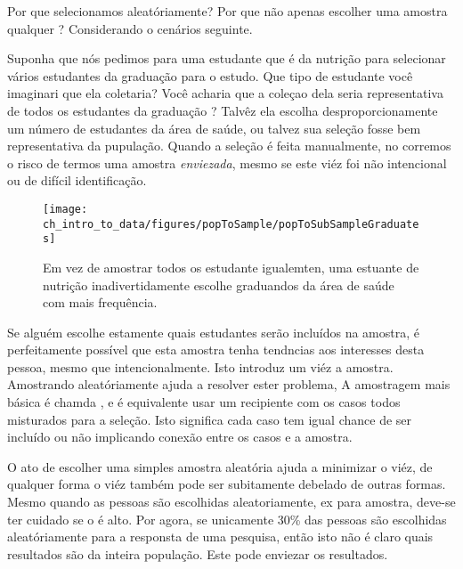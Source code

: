 Por que selecionamos aleatóriamente? Por que não apenas escolher uma amostra qualquer ? Considerando o cenários seguinte.

\begin{example}{Suponha que nós pedimos para uma estudante  que é da nutrição para selecionar vários estudantes da graduação para o estudo. Que tipo de estudante você imaginari que ela coletaria? Você acharia que a coleçao dela seria representativa de todos os estudantes da graduação ?}
Talvêz ela escolha desproporcionamente um número de estudantes da área de saúde, ou talvez sua seleção fosse bem representativa da pupulação. Quando a seleção é feita manualmente, no corremos o risco de termos uma amostra \emph{enviezada}, mesmo se este viéz foi não intencional ou de difícil identificação.
\end{example}

\begin{figure}
\centering
\texttt{[image: ch\_intro\_to\_data/figures/popToSample/popToSubSampleGraduates]}
\caption{Em vez de amostrar todos os estudante igualemten, uma estuante de nutrição inadivertidamente escolhe graduandos da área de saúde com mais frequência.}
\label{popToSubSampleGraduates}
\end{figure}

Se alguém escolhe estamente quais estudantes serão incluídos na amostra, é perfeitamente possível que esta amostra tenha tendncias aos interesses desta pessoa, mesmo que intencionalmente. Isto introduz um viéz a amostra. Amostrando aleatóriamente ajuda a resolver ester problema, A amostragem mais básica é chamda , e é equivalente usar um recipiente com os casos todos misturados para a seleção. Isto significa  cada caso tem igual chance de ser incluído ou não implicando conexão entre os casos e a amostra.


O ato de escolher uma simples amostra aleatória ajuda a minimizar o viéz, de qualquer forma o viéz também pode ser subitamente debelado de outras formas.
Mesmo quando as pessoas são escolhidas aleatoriamente, ex para amostra, deve-se ter cuidado se o    é alto. Por agora, se unicamente 30\% das pessoas são escolhidas aleatóriamente para a responsta de uma pesquisa, então isto não é claro quais resultados são  da inteira população. Este   pode enviezar os resultados.

